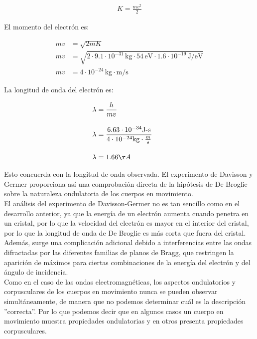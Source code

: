 \documentclass[a4paper]{article}
\begin{document}
    \begin{align}
        K=\frac{mv^2}{2} \tag*{} 
    \end{align}

    \indent El momento del electrón es:

    \begin{align}
        mv &=\sqrt{2mK} \tag*{} \\[10pt]
        mv &=\sqrt{2 \cdot 9.1 \cdot 10^{-31} \, \text{kg} \cdot 54 \, \text{eV} \cdot 1.6 \cdot 10^{-19} \, \text{J/eV}} \tag*{} \\[10pt]
        mv &= 4 \cdot 10^{-24} \, \text{kg} \cdot \text{m/s} \tag*{}
    \end{align}

    \indent La longitud de onda del electrón es:

    \begin{align}
        \lambda &= \frac{h}{mv} \tag*{} \\[10pt]
        \lambda &= \frac{6.63 \cdot 10^{-34} \text{J-s}}{4 \cdot 10^{-24} \text{kg} \cdot \frac {m}{s}} \tag*{} \\[10pt]
        \lambda &= 1.66 \AA \tag*{}
    \end{align}

    \indent Esto concuerda con la longitud de onda observada. El experimento de Davisson y Germer proporciona así una comprobación directa de la hipótesis de De Broglie sobre la naturaleza ondulatoria de los cuerpos en movimiento.\\
    \indent El análisis del experimento de Davisson-Germer no es tan sencillo como en el desarrollo anterior, ya que la energía de un electrón aumenta cuando penetra en un cristal, por lo que la velocidad del electrón es mayor en el interior del cristal, por lo que la longitud de onda de De Broglie es más corta que fuera del cristal. Además, surge una complicación adicional debido a interferencias entre las ondas difractadas por las diferentes familias de planos de Bragg, que restringen la aparición de máximos para ciertas combinaciones de la energía del electrón y del ángulo de incidencia.\\

\indent Como en el caso de las ondas electromagnéticas, los aspectos ondulatorios y corpusculares de los cuerpos en movimiento nunca se pueden observar simultáneamente, de manera que no podemos determinar cuál es la descripción ''correcta''. Por lo que podemos decir que en algunos casos un cuerpo en movimiento muestra propiedades ondulatorias y en otros presenta propiedades corpusculares. 
\end{document}
